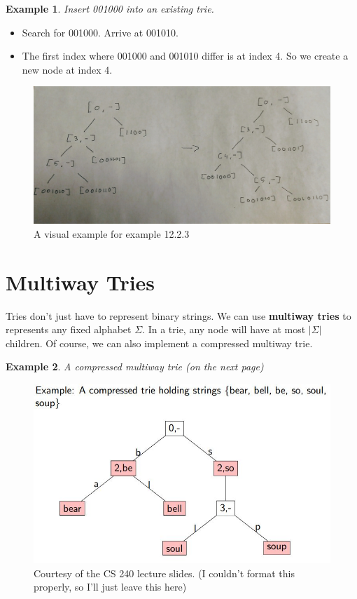 \documentclass{report}
\newtheorem{ex}{Example}[section]
\begin{document}
\begin{ex}
Insert 001000 into an existing trie.
\end{ex}
\begin{itemize}
\item Search for 001000. Arrive at 001010.
\item The first index where 001000 and 001010 differ is at index 4. So we create a new node at index 4.
\end{itemize}
\begin{figure}[ht]
\begin{center}
\includegraphics[scale=0.1]{trieEx2.jpg}
\end{center}
\caption{A visual example for example 12.2.3}
\end{figure}\newpage
\section{Multiway Tries}
Tries don't just have to represent binary strings. We can use \textbf{multiway tries} to represents any fixed alphabet $\Sigma$. In a trie, any node will have at most $|\Sigma|$ children. Of course, we can also implement a compressed multiway trie.
\begin{ex}
A compressed multiway trie (on the next page)
\end{ex}
\begin{figure}[ht]
\begin{center}
\includegraphics[scale=0.7]{mtrie2.jpg}
\end{center}
\caption{Courtesy of the CS 240 lecture slides. (I couldn't format this properly, so I'll just leave this here)}
\end{figure}
\end{document}
